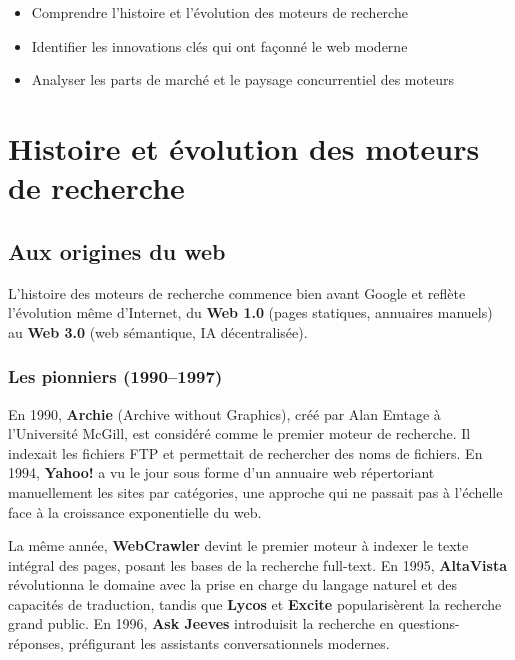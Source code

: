 \documentclass[12pt,a4paper,twoside]{report}
\newcommand{\keyword}[1]{\textbf{\textcolor{googleblue}{#1}}}
\newcommand{\level}[1]{\medskip\bigskip}
\begin{document}
\level{1}
\begin{objectives}
\begin{itemize}
    \item Comprendre l'histoire et l'évolution des moteurs de recherche
    \item Identifier les innovations clés qui ont façonné le web moderne
    \item Analyser les parts de marché et le paysage concurrentiel des moteurs
\end{itemize}
\end{objectives}

\chapter{Histoire et évolution des moteurs de recherche}
\label{ch:histoire}

\section{Aux origines du web}

L'histoire des moteurs de recherche commence bien avant Google et reflète l'évolution même d'Internet, du \keyword{Web 1.0} (pages statiques, annuaires manuels) au \keyword{Web 3.0} (web sémantique, IA décentralisée).

\subsection{Les pionniers (1990--1997)}

En 1990, \keyword{Archie} (Archive without Graphics), créé par Alan Emtage à l'Université McGill, est considéré comme le premier moteur de recherche. Il indexait les fichiers FTP et permettait de rechercher des noms de fichiers. En 1994, \keyword{Yahoo!} a vu le jour sous forme d'un annuaire web répertoriant manuellement les sites par catégories, une approche qui ne passait pas à l'échelle face à la croissance exponentielle du web.

La même année, \keyword{WebCrawler} devint le premier moteur à indexer le texte intégral des pages, posant les bases de la recherche full-text. En 1995, \keyword{AltaVista} révolutionna le domaine avec la prise en charge du langage naturel et des capacités de traduction, tandis que \keyword{Lycos} et \keyword{Excite} popularisèrent la recherche grand public. En 1996, \keyword{Ask Jeeves} introduisit la recherche en questions-réponses, préfigurant les assistants conversationnels modernes.
\end{document}
